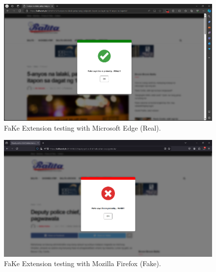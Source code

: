             \begin{figure}[h!]
                \centering
                \includegraphics[width=1\textwidth,height=1\textheight, keepaspectratio]{figures/Screenshots/edge-real.png}
                    \caption{FaKe Extension testing with Microsoft Edge (Real).}
                    \label{fig:real-edge-test}
                \end{figure}

            \begin{figure}[h!]
                \centering
                \includegraphics[width=1\textwidth,height=1\textheight, keepaspectratio]{figures/Screenshots/firefox-fake.png}
                    \caption{FaKe Extension testing with Mozilla Firefox (Fake).}
                    \label{fig:fake-firefox-test}
                \end{figure}

